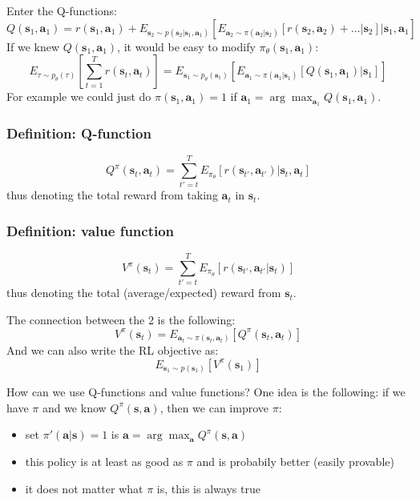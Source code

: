 \documentclass{report}
\newcommand{\argmax}{\arg\!\max}
\begin{document}
Enter the Q-functions:
\begin{equation}
		Q(\bm{s}_1, \bm{a}_1) = 
r(\bm{s}_1, \bm{a}_1) + E_{\bm{s}_2  \sim p(\bm{s}_2 | \bm{s}_1, \bm{a}_1)} 
\left [				E_{\bm{a}_2 \sim \pi(\bm{a}_2|\bm{s}_2)}
				\left[ r(\bm{s}_2, \bm{a}_2) + \dots | \bm{s}_2 \right] | \bm{s}_1, \bm{a}_1
\right]
\end{equation}
If we knew $Q(\bm{s}_1, \bm{a}_1)$, it would be easy to modify $\pi_\theta (\bm{s}_1, \bm{a}_1)$:
\begin{equation}
	E_{\tau \sim p_\theta(\tau)} \left[  \sum_{t=1}^{T} r(\bm{s}_t, \bm{a}_t) \right] 	
	= E_{\bm{s}_1 \sim p_\theta(\bm{s}_1)}
	\left[  E_{\bm{a}_1 \sim \pi(\bm{a}_1|\bm{s}_1)} \left[ Q(\bm{s}_1, \bm{a}_1) |\bm{s}_1 \right]   \right] 
\end{equation}
For example we could just do $\pi(\bm{s}_1, \bm{a}_1) = 1$ 
if $\bm{a}_1 = \argmax_{\bm{a}_1} Q(\bm{s}_1, \bm{a}_1)$.

\subsubsection{Definition: Q-function}
\begin{equation}
		Q^\pi (\bm{s}_t, \bm{a}_t) = \sum_{t'=t}^{T} E_{\pi_\theta}
		\left[ r(\bm{s}_{t'}, \bm{a}_{t'} )| \bm{s}_t, \bm{a}_t \right] 
\end{equation}
thus denoting the total reward from taking $\bm{a}_t$ in $\bm{s}_t$.

\subsubsection{Definition: value function}
\begin{equation}
		V^\pi (\bm{s}_t) = \sum_{t'=t}^{T} E_{\pi_\theta}
		\left[ r(\bm{s}_{t'}, \bm{a}_{t'} | \bm{s}_t) \right] 
\end{equation}
thus denoting the total (average/expected) reward from $\bm{s}_t$.

The connection between the 2 is the following:
\begin{equation}
		V^\pi (\bm{s}_t) = E_{\bm{a}_t \sim \pi(\bm{s}_t, \bm{a}_t)}
		\left[ Q^\pi(\bm{s}_t, \bm{a}_t) \right] 
\end{equation}
And we can also write the RL objective as:
\begin{equation}
		E_{\bm{s}_1 \sim p(\bm{s}_1)}
		\left[ V^\pi (\bm{s}_1) \right] 
\end{equation}

How can we use Q-functions and value functions?
One idea is the following: if we have $\pi$ and we know $Q^\pi(\bm{s}, \bm{a})$,
then we can improve $\pi$:
\begin{itemize}
		\item set $\pi'(\bm{a}|\bm{s}) = 1$ is $\bm{a} = \argmax_{\bm{a}} Q^\pi(\bm{s}, \bm{a})$
		\item this policy is at least as good as $\pi$ and is probabily better (easily provable)
		\item it does not matter what $\pi$ is, this is always true
\end{itemize}
\end{document}
